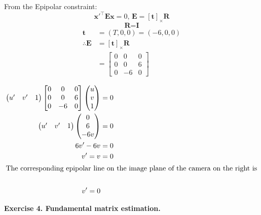 \documentclass[letterpaper, 11pt]{article}
\begin{document}
From the Epipolar constraint:
$$ \textbf{x}'^\top\textbf{E}\textbf{x}=0 \text{,\ } \textbf{E} = [\textbf{t}]_\times\textbf{R}$$
$$ \textbf{R} = \textbf{I}$$
\begin{align*}
    \textbf{t} & = (T, 0, 0) = (-6, 0, 0)       \\
    \therefore
    \textbf{E} & =[\textbf{t}]_\times\textbf{R} \\
               & =
    \begin{bmatrix}
        0 & 0  & 0 \\
        0 & 0  & 6 \\
        0 & -6 & 0
    \end{bmatrix}                              \\
\end{align*}
\begin{align*}
    \begin{pmatrix}
        u' & v' & 1
    \end{pmatrix}
    \begin{bmatrix}
        0 & 0  & 0 \\
        0 & 0  & 6 \\
        0 & -6 & 0
    \end{bmatrix}
    \begin{pmatrix}
        u \\
        v \\
        1
    \end{pmatrix}
              & =0                                                                               \\
    \begin{pmatrix}
        u' & v' & 1
    \end{pmatrix}
    \begin{pmatrix}
        0 \\
        6 \\
        -6v
    \end{pmatrix}
              & =0                                                                               \\
    6 v' -6 v & =0                                                                               \\
    v' = v    & = 0                                                                              \\
    \intertext{The corresponding epipolar line on the image plane of the camera on the right is} \\
    v'=0      &     &
\end{align*}

\textbf{Exercise 4. Fundamental matrix estimation.}
\end{document}
